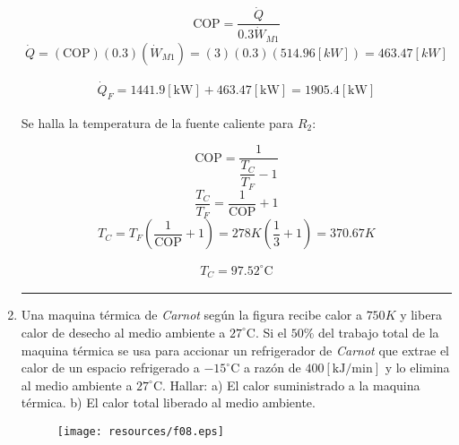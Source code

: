 \documentclass[letter,10pt]{article}
\begin{document}
\begin{enumerate}
\begin{equation*}
    \text{COP} = \frac{\dot{Q}}{0.3\dot{W}_{M1}}
\end{equation*}
\begin{equation*}
    \dot{Q} = (\text{COP})(0.3)(\dot{W}_{M1})
            = (3)(0.3)(514.96[kW])
            = 463.47[kW]
\end{equation*}

\begin{equation*}
\boxed{
    \begin{array}{l}
        \dot{Q}_F = 1441.9[\text{kW}] + 463.47[\text{kW}]
                  = 1905.4[\text{kW}]
    \end{array}
}
\end{equation*}

Se halla la temperatura de la fuente caliente para $R_2$:

\begin{equation*}
    \text{COP} = \dfrac{1}{\dfrac{T_C}{T_F} - 1}
\end{equation*}
\begin{equation*}
    \frac{T_C}{T_F} = \frac{1}{\text{COP}} + 1
\end{equation*}
\begin{equation*}
    T_C = T_F\left(\frac{1}{\text{COP}} + 1\right)
        = 278 K\left(\frac{1}{3}+1\right)
        = 370.67 K
\end{equation*}

\begin{equation*}
\boxed{
    \begin{array}{l}
        T_C = 97.52^\circ\text{C}
    \end{array}
}
\end{equation*}

\noindent\rule{15.2cm}{0.4pt}

\item Una maquina térmica de \emph{Carnot} según la figura recibe calor a
$750 K$ y libera calor de desecho al medio ambiente a $27^\circ\text{C}$. Si el
$50\%$ del trabajo total de la maquina térmica se usa para accionar un
refrigerador de \emph{Carnot} que extrae el calor de un espacio refrigerado a
$-15^\circ\text{C}$ a razón de $400[\text{kJ}/\text{min}]$ y lo elimina al medio
ambiente a $27^\circ\text{C}$. Hallar: a) El calor suministrado a la maquina
térmica. b) El calor total liberado al medio ambiente.

\begin{figure}[H]
\centering
\texttt{[image: resources/f08.eps]}
\end{figure}


\end{enumerate}
\end{document}

